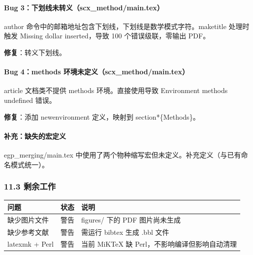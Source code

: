 \documentclass[
  12pt,
]{ctexart}
\begin{document}
\paragraph{Bug
3：下划线未转义（scx\_method/main.tex）}\label{bug-3ux4e0bux5212ux7ebfux672aux8f6cux4e49scx_methodmain.tex}

author 命令中的邮箱地址包含下划线，下划线是数学模式字符。maketitle
处理时触发 Missing dollar inserted，导致 100 个错误级联，零输出 PDF。

\textbf{修复}：转义下划线。

\paragraph{Bug 4：methods
环境未定义（scx\_method/main.tex）}\label{bug-4methods-ux73afux5883ux672aux5b9aux4e49scx_methodmain.tex}

article 文档类不提供 methods 环境。直接使用导致 Environment methods
undefined 错误。

\textbf{修复}：添加 newenvironment 定义，映射到 section*\{Methods\}。

\paragraph{补充：缺失的宏定义}\label{ux8865ux5145ux7f3aux5931ux7684ux5b8fux5b9aux4e49}

egp\_merging/main.tex
中使用了两个物种缩写宏但未定义。补充定义（与已有命名模式统一）。

\subsubsection{11.3 剩余工作}\label{ux5269ux4f59ux5de5ux4f5c}

\begin{longtable}[]{@{}
  >{\raggedright\arraybackslash}p{}
  >{\centering\arraybackslash}p{}
  >{\raggedright\arraybackslash}p{}@{}}
\toprule\noalign{}
\begin{minipage}[b]{\linewidth}\raggedright
问题
\end{minipage} & \begin{minipage}[b]{\linewidth}\centering
状态
\end{minipage} & \begin{minipage}[b]{\linewidth}\raggedright
说明
\end{minipage} \\
\midrule\noalign{}
\endhead
\bottomrule\noalign{}
\endlastfoot
缺少图片文件 & 警告 & figures/ 下的 PDF 图片尚未生成 \\
缺少参考文献 & 警告 & 需运行 bibtex 生成 .bbl 文件 \\
latexmk + Perl & 警告 & 当前 MiKTeX 缺 Perl，不影响编译但影响自动清理 \\
\end{longtable}
\end{document}
